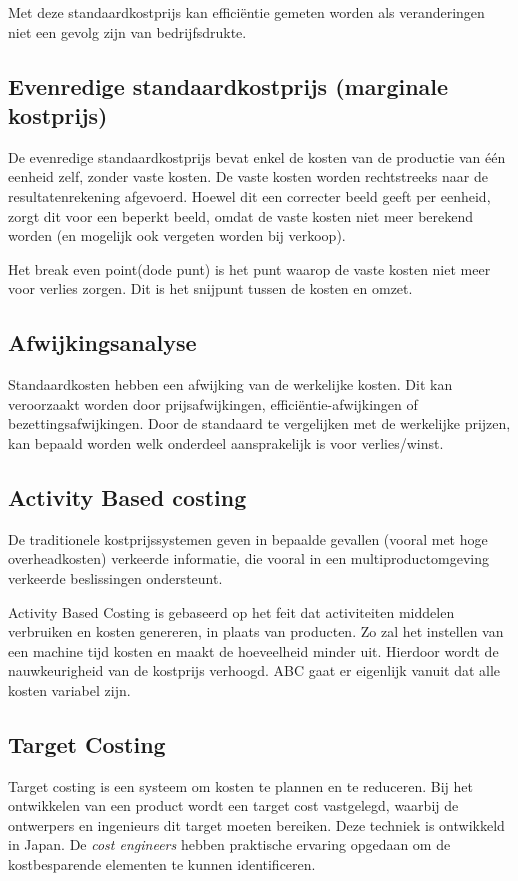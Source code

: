 \documentclass[../../samenvatting.tex]{subfiles}
\begin{document}
Met deze standaardkostprijs kan efficiëntie gemeten worden als veranderingen niet een gevolg zijn van bedrijfsdrukte.

\subsection{Evenredige standaardkostprijs (marginale kostprijs)}
De evenredige standaardkostprijs bevat enkel de kosten van de productie van één eenheid zelf, zonder vaste kosten. De vaste kosten worden rechtstreeks naar de resultatenrekening afgevoerd. Hoewel dit een correcter beeld geeft per eenheid, zorgt dit voor een beperkt beeld, omdat de vaste kosten niet meer berekend worden (en mogelijk ook vergeten worden bij verkoop).

Het break even point(dode punt) is het punt waarop de vaste kosten niet meer voor verlies zorgen. Dit is het snijpunt tussen de kosten en omzet.

\subsection{Afwijkingsanalyse}

Standaardkosten hebben een afwijking van de werkelijke kosten. Dit kan veroorzaakt worden door prijsafwijkingen, efficiëntie-afwijkingen of bezettingsafwijkingen. Door de standaard te vergelijken met de werkelijke prijzen, kan bepaald worden welk onderdeel aansprakelijk is voor verlies/winst.

\subsection{Activity Based costing}
De traditionele kostprijssystemen geven in bepaalde gevallen (vooral met hoge overheadkosten) verkeerde informatie, die vooral in een multiproductomgeving verkeerde beslissingen ondersteunt.

Activity Based Costing is gebaseerd op het feit dat activiteiten middelen verbruiken en kosten genereren, in plaats van producten. Zo zal het instellen van een machine tijd kosten en maakt de hoeveelheid minder uit. Hierdoor wordt de nauwkeurigheid van de kostprijs verhoogd. ABC gaat er eigenlijk vanuit dat alle kosten variabel zijn.

\subsection{Target Costing}

Target costing is een systeem om kosten te plannen en te reduceren. Bij het ontwikkelen van een product wordt een target cost vastgelegd, waarbij de ontwerpers en ingenieurs dit target moeten bereiken. Deze techniek is ontwikkeld in Japan. De \emph{cost engineers} hebben praktische ervaring opgedaan om de kostbesparende elementen te kunnen identificeren.
\end{document}
